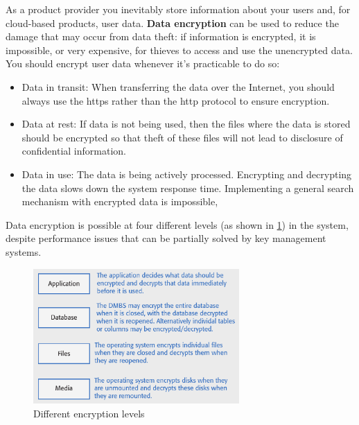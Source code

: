 \documentclass[10pt,a4paper]{report}
\begin{document}
As a product provider you inevitably store information about your users and, for cloud-based products, user data. \textbf{Data encryption} can be used to reduce the damage that may occur from data
theft: if information is encrypted, it is impossible, or very expensive, for thieves to access and use the unencrypted data. You should encrypt user data whenever it's practicable to do so:
\begin{itemize}
	\item Data in transit: When transferring the data over the Internet, you should always use the https rather
	than the http protocol to ensure encryption.
	\item Data at rest: If data is not being used, then the files where the data is stored should be encrypted
	so that theft of these files will not lead to disclosure of confidential information.
	\item Data in use: The data is being actively processed. Encrypting and decrypting the data slows
	down the system response time. Implementing a general search mechanism with
	encrypted data is impossible,
\end{itemize}
Data encryption is possible at four different levels (as shown in \ref{image92}) in the system, despite performance issues that can be partially solved by key management systems.
\begin{figure}[h]
	\centering
	\includegraphics[width=0.7\textwidth]{image92}
	\caption{Different encryption levels}
	\label{image92}
\end{figure} 
\end{document}
